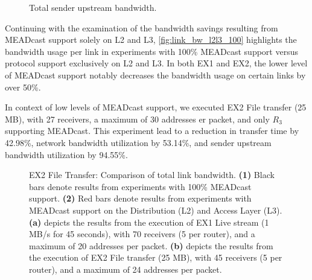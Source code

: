 \begin{figure}
    \begin{center}
        
    \end{center}
    \caption[Total sender upstream bandwidth]{Total sender upstream bandwidth.}
    \label{fig:upstreamcmp}
\end{figure}

Continuing with the examination of the bandwidth savings resulting from
    MEADcast support solely on L2 and L3, \autoref{fig:link_bw_l2l3_100}
    highlights the bandwidth usage per link in experiments with 100\% MEADcast
    support versus protocol support exclusively on L2 and L3.
In both EX1 and EX2, the lower level of MEADcast support notably decreases
    the bandwidth usage on certain links by over 50\%.
    
In context of low levels of MEADcast support, we executed EX2 File transfer
    (25 MB), with 27 receivers, a maximum of 30 addresses er packet, and only
    $R_3$ supporting MEADcast.
This experiment lead to a reduction in transfer time by 42.98\%, network
    bandwidth utilization by 53.14\%, and sender upstream bandwidth utilization
    by 94.55\%.

\begin{figure}
    \begin{center}
        
    \end{center}
    \caption[EX2 File Transfer: Comparison of total link bandwidth]{
        EX2 File Transfer: Comparison of total link bandwidth.
        \textbf{(1)} Black bars denote results from experiments with 100\%
            MEADcast support.
        \textbf{(2)} Red bars denote results from experiments with MEADcast
            support on the Distribution (L2) and Access Layer (L3).
        \textbf{(a)} depicts the results from the execution of EX1 Live
            stream (1 MB/s for 45 seconds), with 70 receivers (5 per router),
            and a maximum of 20 addresses per packet.
        \textbf{(b)} depicts the results from the execution of EX2 File
            transfer (25 MB), with 45 receivers (5 per router), and a maximum
            of 24 addresses per packet.
    }
    \label{fig:link_bw_l2l3_100}
\end{figure}

